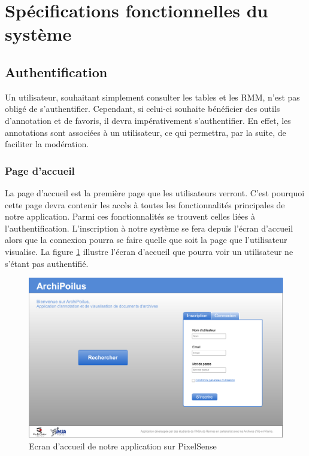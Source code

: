\documentclass[a4paper]{article}
\begin{document}
\newpage
\section{Spécifications fonctionnelles du système}

\subsection{Authentification}

Un utilisateur, souhaitant simplement consulter les tables et les RMM, n'est pas obligé de s'authentifier. Cependant, si celui-ci souhaite bénéficier des outils d'annotation et de favoris, il devra impérativement s'authentifier. En effet, les annotations sont associées à un utilisateur, ce qui permettra, par la suite, de faciliter la modération.

\subsubsection{Page d'accueil} 

La page d'accueil est la première page que les utilisateurs verront. C'est pourquoi cette page devra contenir les accès à toutes les fonctionnalités principales de notre application. Parmi ces fonctionnalités se trouvent celles liées à l'authentification. L'inscription à notre système se fera depuis l'écran d'accueil alors que la connexion pourra se faire quelle que soit la page que l'utilisateur visualise. La figure \ref{fig:accueil} illustre l'écran d'accueil que pourra voir un utilisateur ne s'étant pas authentifié.

\begin{figure}[H]
\centering
\includegraphics[width=\textwidth]{accueil.png}
\caption{Ecran d'accueil de notre application sur PixelSense}
\label{fig:accueil}
\end{figure}
\end{document}
